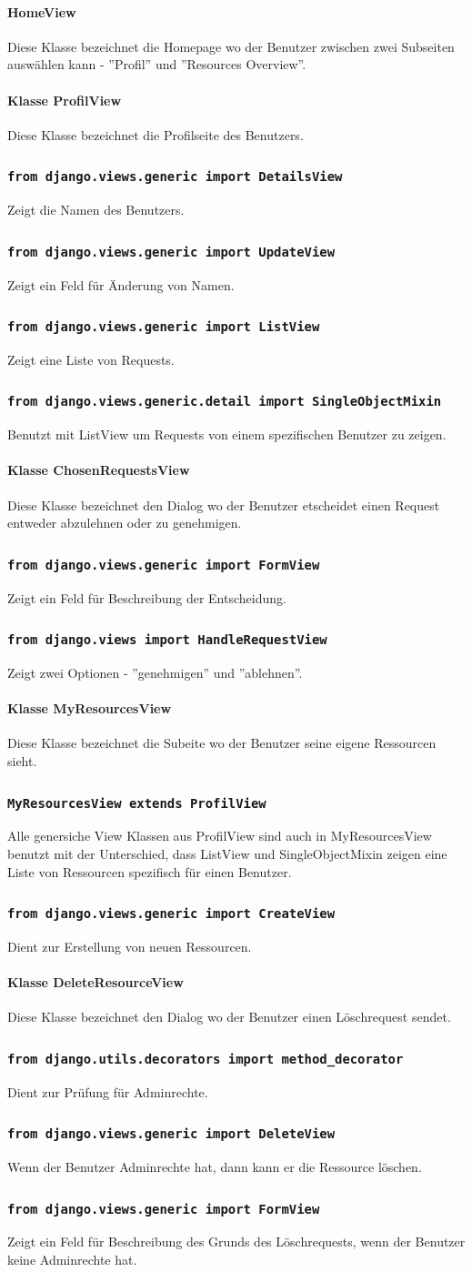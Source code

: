 \documentclass[parskip=full,11pt]{scrartcl}
\newcommand{\class}[1]{\subsubsection*{\lstinline[basicstyle=\ttfamily\large]{#1}}}
\begin{document}
\paragraph*{HomeView}
Diese Klasse bezeichnet die Homepage wo der Benutzer zwischen zwei Subseiten auswählen kann - ''Profil'' und ''Resources Overview''.

\paragraph*{Klasse ProfilView}
 Diese Klasse bezeichnet die Profilseite des Benutzers.
\class{from django.views.generic import DetailsView} 
 Zeigt die Namen des Benutzers.
\class{from django.views.generic import UpdateView}
 Zeigt ein Feld für Änderung von Namen.
\class{from django.views.generic import ListView}
 Zeigt eine Liste von Requests.
\class{from django.views.generic.detail import SingleObjectMixin}
 Benutzt mit ListView um Requests von einem spezifischen Benutzer zu zeigen.
 
\paragraph*{Klasse ChosenRequestsView}
 Diese Klasse bezeichnet den Dialog wo der Benutzer etscheidet einen Request entweder abzulehnen oder zu genehmigen. 
\class{from django.views.generic import FormView} 
 Zeigt ein Feld für Beschreibung der Entscheidung.
\class{from django.views import HandleRequestView}
 Zeigt zwei Optionen - ''genehmigen'' und ''ablehnen''.
 
\paragraph*{Klasse MyResourcesView}
 Diese Klasse bezeichnet die Subeite wo der Benutzer seine eigene Ressourcen sieht.
\class{MyResourcesView extends ProfilView}
 Alle genersiche View Klassen aus ProfilView sind auch in MyResourcesView benutzt mit der Unterschied, dass ListView und SingleObjectMixin zeigen eine Liste von Ressourcen spezifisch für einen Benutzer.
\class{from django.views.generic import CreateView}
Dient zur Erstellung von neuen Ressourcen.

\paragraph*{Klasse DeleteResourceView}
 Diese Klasse bezeichnet den Dialog wo der Benutzer einen Löschrequest sendet.
 \class{from django.utils.decorators import method_decorator}
 Dient zur Prüfung für Adminrechte. 
 \class{from django.views.generic import DeleteView}
 Wenn der Benutzer Adminrechte hat, dann kann er die Ressource löschen.
 \class{from django.views.generic import FormView}
 Zeigt ein Feld für Beschreibung des Grunds des Löschrequests, wenn der Benutzer keine Adminrechte hat.
 
\end{document}

